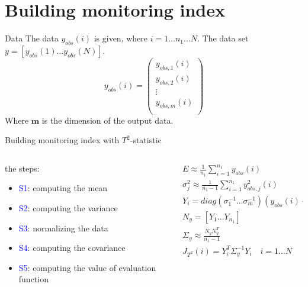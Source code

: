 \documentclass[10pt]{beamer}
\begin{document}
\section{Building monitoring index}
\begin{frame}{Data}
The data $y_{obs}(i)$ is given, where $i = 1 \dots n_1 \dots N$.
The data set $y = [y_{obs}(1) \dots y_{obs}(N)]$.
\begin{equation}
    y_{obs}(i)= 
    \begin{pmatrix}
        y_{obs,1}(i) \\
        y_{obs,2}(i) \\
       \vdots  \\
        y_{obs,m}(i) \\ 
    \end{pmatrix}
\end{equation}
Where $\textbf{m}$ is the dimension of the output data.%
\par
\end{frame}
\begin{frame}{Building monitoring index with $T^2$-statistic}
    \begin{columns}
        \begin{column}{0.5\textwidth}
            the steps: %
      \begin{itemize}
      \item \textcolor{blue}{S1}: computing the mean \\
      \item \textcolor{blue}{S2}: computing the variance
      \item \textcolor{blue}{S3}: normalizing the data
      \item \textcolor{blue}{S4}: computing the  covariance
      \item \textcolor{blue}{S5}: computing the value of evaluation function
 	 \end{itemize}  
        \end{column}
        \begin{column}{0.5\textwidth}  %
      \begin{equation} \nonumber
               \begin{aligned}
                  & E \approx \frac{1}{n_1}\sum_{i=1}^{n_1}y_{obs}(i) \\
                  & \sigma_j^2 \approx \frac{1}{n_1-1}\sum_{i=1}^{n_1}y_{obs,j}^2(i) \\
                  &  Y_i = diag(\sigma^{-1}_1 \dots \sigma^{-1}_m)(y_{obs}(i)-E)  \\
                  &  N_y = [Y_1 \dots Y_{n_1}] \\
                  & \Sigma_y \approx \frac{N_yN_y^T}{n_1-1} \\
                  & J_{T^2}(i) = Y_i^T\Sigma_y^{-1}Y_i \quad i = 1\dots N\\  
             \end{aligned}
     \end{equation}
    
        \end{column}
    \end{columns}
\end{frame}
\end{document}
